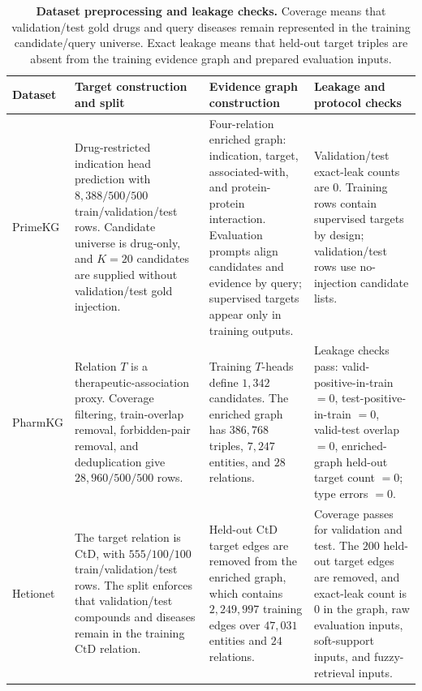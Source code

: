 \documentclass[11pt]{article}
\begin{document}
    \begin{table}[H]
    \caption{\textbf{Dataset preprocessing and leakage checks.} Coverage means that validation/test gold drugs and query diseases remain represented in the training candidate/query universe. Exact leakage means that held-out target triples are absent from the training evidence graph and prepared evaluation inputs.}
    \label{tab:s15_preprocessing_leakage}
    \footnotesize
    \begin{tabularx}{\textwidth}{L{0.12\textwidth} Y Y Y}
    \toprule
    Dataset & Target construction and split & Evidence graph construction & Leakage and protocol checks \\
    \midrule
    PrimeKG &
    Drug-restricted indication head prediction with \(8{,}388/500/500\) train/validation/test rows. Candidate universe is drug-only, and \(K=20\) candidates are supplied without validation/test gold injection. &
    Four-relation enriched graph: indication, target, associated-with, and protein-protein interaction. Evaluation prompts align candidates and evidence by query; supervised targets appear only in training outputs. &
    Validation/test exact-leak counts are \(0\). Training rows contain supervised targets by design; validation/test rows use no-injection candidate lists. \\
    \addlinespace
    PharmKG &
    Relation \(T\) is a therapeutic-association proxy. Coverage filtering, train-overlap removal, forbidden-pair removal, and deduplication give \(28{,}960/500/500\) rows. &
    Training \(T\)-heads define \(1{,}342\) candidates. The enriched graph has \(386{,}768\) triples, \(7{,}247\) entities, and \(28\) relations. &
    Leakage checks pass: valid-positive-in-train \(=0\), test-positive-in-train \(=0\), valid-test overlap \(=0\), enriched-graph held-out target count \(=0\); type errors \(=0\). \\
    \addlinespace
    Hetionet &
    The target relation is \(\mathrm{CtD}\), with \(555/100/100\) train/validation/test rows. The split enforces that validation/test compounds and diseases remain in the training \(\mathrm{CtD}\) relation. &
    Held-out \(\mathrm{CtD}\) target edges are removed from the enriched graph, which contains \(2{,}249{,}997\) training edges over \(47{,}031\) entities and \(24\) relations. &
    Coverage passes for validation and test. The \(200\) held-out target edges are removed, and exact-leak count is \(0\) in the graph, raw evaluation inputs, soft-support inputs, and fuzzy-retrieval inputs. \\

\end{tabularx}
\end{table}
\end{document}
